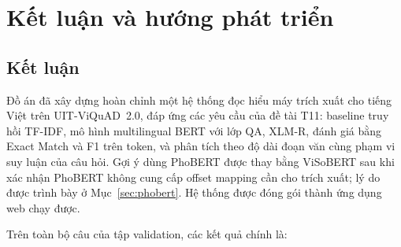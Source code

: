 \bigskip
\section{Kết luận và hướng phát triển}
\label{sec:conclusion}

\subsection{Kết luận}

Đồ án đã xây dựng hoàn chỉnh một hệ thống đọc hiểu máy trích xuất cho tiếng Việt trên
UIT-ViQuAD~2.0, đáp ứng các yêu cầu của đề tài T11: baseline truy hồi TF-IDF, mô hình
multilingual BERT với lớp QA, XLM-R, đánh giá bằng Exact Match và F1 trên token, và phân tích
theo độ dài đoạn văn cùng phạm vi suy luận của câu hỏi. Gợi ý dùng PhoBERT được thay bằng
ViSoBERT sau khi xác nhận PhoBERT không cung cấp offset mapping cần cho trích xuất; lý do được
trình bày ở Mục~\ref{sec:phobert}. Hệ thống được đóng gói thành ứng dụng web chạy được.

\ifhasFullEval
Trên toàn bộ \valN{} câu của tập validation, các kết quả chính là:

